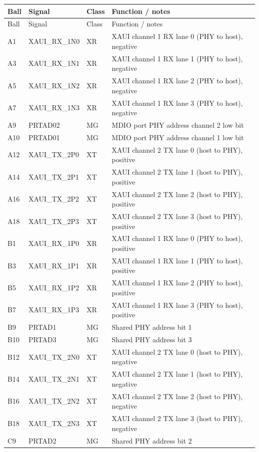 \documentclass[10pt,a4paper]{article}
\begin{document}
\begin{longtable}{@{}p{12mm}p{44mm}p{10mm}p{91mm}@{}}\toprule
Ball & Signal & Class & Function / notes\\\midrule\endfirsthead
\toprule Ball & Signal & Class & Function / notes\\\midrule\endhead
A1 & XAUI\_RX\_1N0 & XR & XAUI channel 1 RX lane 0 (PHY to host), negative\\
A3 & XAUI\_RX\_1N1 & XR & XAUI channel 1 RX lane 1 (PHY to host), negative\\
A5 & XAUI\_RX\_1N2 & XR & XAUI channel 1 RX lane 2 (PHY to host), negative\\
A7 & XAUI\_RX\_1N3 & XR & XAUI channel 1 RX lane 3 (PHY to host), negative\\
A9 & PRTAD02 & MG & MDIO port PHY address channel 2 low bit\\
A10 & PRTAD01 & MG & MDIO port PHY address channel 1 low bit\\
A12 & XAUI\_TX\_2P0 & XT & XAUI channel 2 TX lane 0 (host to PHY), positive\\
A14 & XAUI\_TX\_2P1 & XT & XAUI channel 2 TX lane 1 (host to PHY), positive\\
A16 & XAUI\_TX\_2P2 & XT & XAUI channel 2 TX lane 2 (host to PHY), positive\\
A18 & XAUI\_TX\_2P3 & XT & XAUI channel 2 TX lane 3 (host to PHY), positive\\
B1 & XAUI\_RX\_1P0 & XR & XAUI channel 1 RX lane 0 (PHY to host), positive\\
B3 & XAUI\_RX\_1P1 & XR & XAUI channel 1 RX lane 1 (PHY to host), positive\\
B5 & XAUI\_RX\_1P2 & XR & XAUI channel 1 RX lane 2 (PHY to host), positive\\
B7 & XAUI\_RX\_1P3 & XR & XAUI channel 1 RX lane 3 (PHY to host), positive\\
B9 & PRTAD1 & MG & Shared PHY address bit 1\\
B10 & PRTAD3 & MG & Shared PHY address bit 3\\
B12 & XAUI\_TX\_2N0 & XT & XAUI channel 2 TX lane 0 (host to PHY), negative\\
B14 & XAUI\_TX\_2N1 & XT & XAUI channel 2 TX lane 1 (host to PHY), negative\\
B16 & XAUI\_TX\_2N2 & XT & XAUI channel 2 TX lane 2 (host to PHY), negative\\
B18 & XAUI\_TX\_2N3 & XT & XAUI channel 2 TX lane 3 (host to PHY), negative\\
C9 & PRTAD2 & MG & Shared PHY address bit 2\\

\end{longtable}
\end{document}
